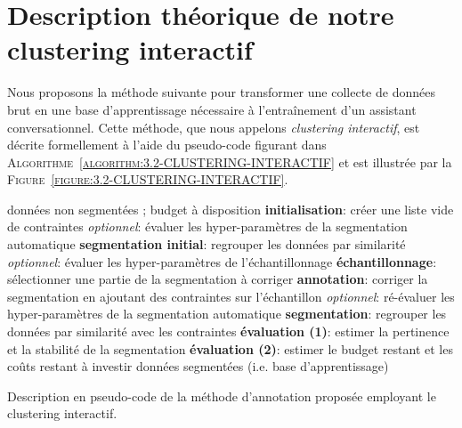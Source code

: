     \section{Description théorique de notre clustering interactif}
	\label{section:3.2-DESCRIPTION-THEORIQUE}
    
		Nous proposons la méthode suivante pour transformer une collecte de données brut en une base d'apprentissage nécessaire à l’entraînement d'un assistant conversationnel.
		Cette méthode, que nous appelons \textit{clustering interactif}, est décrite formellement à l'aide du pseudo-code figurant dans \textsc{Algorithme~\ref{algorithm:3.2-CLUSTERING-INTERACTIF}} et est illustrée par la \textsc{Figure~\ref{figure:3.2-CLUSTERING-INTERACTIF}}.

		\begin{algorithm}[!htb]
		    \begin{algorithmic}[1]
		        \Require données non segmentées ; budget à disposition
				\State \textbf{initialisation}: créer une liste vide de contraintes
		        \State \textit{optionnel}: évaluer les hyper-paramètres de la segmentation automatique
		        \State \textbf{segmentation initial}: regrouper les données par similarité
		        \Repeat
		            \State \textit{optionnel}: évaluer les hyper-paramètres de l'échantillonnage
		            \State \textbf{échantillonnage}: sélectionner une partie de la segmentation à corriger
		            \State \textbf{annotation}: corriger la segmentation en ajoutant des contraintes sur l'échantillon
		            \State \textit{optionnel}: ré-évaluer les hyper-paramètres de la segmentation automatique
			        \State \textbf{segmentation}: regrouper les données par similarité avec les contraintes
			        \State \textbf{évaluation (1)}: estimer la pertinence et la stabilité de la segmentation
			        \State \textbf{évaluation (2)}: estimer le budget restant et les coûts restant à investir
		        \Ensure données segmentées (i.e. base d'apprentissage)
		    \end{algorithmic}
		    \caption{Description en pseudo-code de la méthode d'annotation proposée employant le clustering interactif.}
		    \label{algorithm:3.2-CLUSTERING-INTERACTIF}
		\end{algorithm}
		
